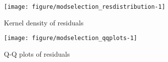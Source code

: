 \documentclass[12pt,a4paper]{article}\usepackage[]{graphicx}\usepackage[]{color}
\newenvironment{knitrout}{}{} %
\begin{document}
\begin{knitrout}
\color{fgcolor}\begin{figure}[htbp]

{\centering \texttt{[image: figure/modselection\_resdistribution-1]} 

}

\caption[Kernel density of residuals]{Kernel density of residuals}\label{fig:modselection_resdistribution}
\end{figure}


\end{knitrout}

\begin{knitrout}
\color{fgcolor}\begin{figure}[htbp]

{\centering \texttt{[image: figure/modselection\_qqplots-1]} 

}

\caption[Q-Q plots of residuals]{Q-Q plots of residuals}\label{fig:modselection_qqplots}
\end{figure}


\end{knitrout}






\end{document}
